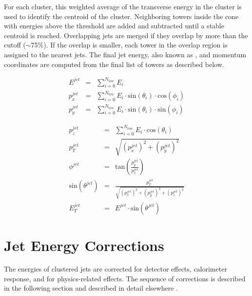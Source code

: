 For each cluster, this weighted average of the transverse energy in the cluster is used to identify the centroid of the cluster. Neighboring towers inside the cone with energies above the threshold are added and subtracted until a stable centroid is reached. Overlapping jets are merged if they overlap by more than the cutoff ($\sim$75\%). If the overlap is smaller, each tower in the overlap region is assigned to the nearest jets. The final jet energy, also known as , and momentum coordinates are computed from the final list of towers as described below.

\begin{eqnarray}
 E^{jet} &=& \sum_{i=0}^{N_{tow}} E_{i}\\
 p_{x}^{jet} &=& \sum_{i=0}^{N_{tow}} E_{i} \cdot \mathrm{sin}(\theta_{i}) \cdot \mathrm{cos}(\phi_{i})\\
 p_{y}^{jet} &=& \sum_{i=0}^{N_{tow}} E_{i} \cdot \mathrm{sin}(\theta_{i}) \cdot \mathrm{sin}(\phi_{i})
\end{eqnarray}

\begin{eqnarray}
p_{z}^{jet} &=& \sum_{i=0}^{N_{tow}} E_{i} \cdot \mathrm{cos}(\theta_{i})\\
p^{jet}_{T} &=& \sqrt{(p_{x}^{jet})^{2}+(p_{y}^{jet})^{2}}\\
\phi^{jet} &=& \mathrm{tan} (\frac{p_{y}^{jet}}{p_{x}^{jet}})\\
\mathrm{sin}(\theta^{jet}) &=& \frac{p^{jet}_{T}}{\sqrt{(p_{x}^{jet})^{2}+(p_{y}^{jet})^{2}+(p_{z}^{jet})^{2}}}\\
E_{T}^{jet} &=& E^{jet}\cdot\mathrm{sin}(\theta^{jet})
\end{eqnarray}


\section{Jet Energy Corrections}
The energies of clustered jets are corrected for detector effects, calorimeter response, and for physics-related effects. The sequence of corrections is described in the following section and described in detail elsewhere \cite{pap:JetCorrections}. %

